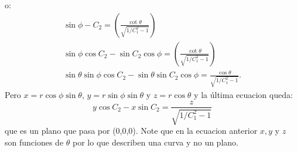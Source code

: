 \documentclass[letterpaper,10pt]{article}
\begin{document}
o:
\begin{eqnarray}
 \sin{\phi-C_2}=\left(\frac{\cot \theta}{\sqrt{1/C_1^2-1}} \right)\\
\sin \phi \cos C_2-\sin C_2 \cos \phi =\left(\frac{\cot \theta}{\sqrt{1/C_1^2-1}} \right)\\
\sin \theta \sin \phi \cos C_2-\sin \theta \sin C_2 \cos \phi=\frac{\cos \theta}{\sqrt{1/C_1^2-1}}.
\end{eqnarray}
Pero $x=r \cos \phi \sin \theta$, $y=r \sin \phi \sin \theta$ y $z=r \cos \theta$ y la \'ultima ecuacion queda:
\begin{equation}
y \cos C_2-x\sin C_2=\frac{z}{\sqrt{1/C_1^2-1}}
\end{equation}
que es un plano que pasa por (0,0,0). Note que en la ecuacion anterior $x,y$ y $z$ son funciones de $\theta$ por lo que describen una curva y no un plano.
\end{document}
